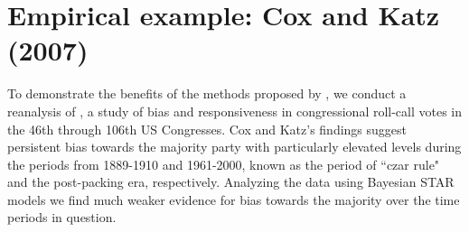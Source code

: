 % 


\chapter{Empirical example: Cox and Katz (2007)}

To demonstrate the benefits of the methods proposed by , we conduct a reanalysis of , a study of bias and responsiveness in congressional roll-call votes in the 46th through 106th US Congresses. Cox and Katz's findings suggest persistent bias towards the majority party with particularly elevated levels during the periods from 1889-1910 and 1961-2000, known as the period of ``czar rule" and the post-packing era, respectively. Analyzing the data using Bayesian STAR models we find much weaker evidence for bias towards the majority over the time periods in question. 

